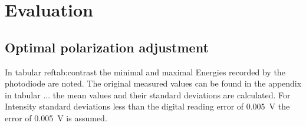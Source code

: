 \section{Evaluation}


\subsection{Optimal polarization adjustment}
In tabular ref{tab:contrast} the minimal and maximal Energies recorded by the photodiode are
noted. The original measured values can be found in the appendix in tabular ...
the mean values and their standard deviations are calculated. For Intensity
standard deviations less than the digital reading error of \qty{0.005}{\volt}
the error of \qty{0.005}{\volt} is assumed.

